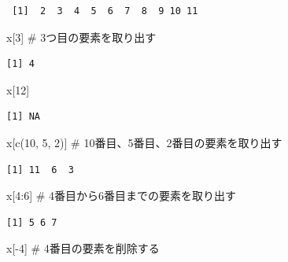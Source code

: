 \documentclass[
  letterpaper,
  DIV=11,
  numbers=noendperiod]{scrreprt}
\newenvironment{Shaded}{\begin{snugshade}}{\end{snugshade}}
\newcommand{\CommentTok}[1]{\textcolor[rgb]{0.37,0.37,0.37}{#1}}
\newcommand{\DecValTok}[1]{\textcolor[rgb]{0.68,0.00,0.00}{#1}}
\newcommand{\FunctionTok}[1]{\textcolor[rgb]{0.28,0.35,0.67}{#1}}
\newcommand{\NormalTok}[1]{\textcolor[rgb]{0.00,0.23,0.31}{#1}}
\newcommand{\SpecialCharTok}[1]{\textcolor[rgb]{0.37,0.37,0.37}{#1}}
\begin{document}
\begin{verbatim}
 [1]  2  3  4  5  6  7  8  9 10 11
\end{verbatim}

\begin{Shaded}
\begin{Highlighting}[]
\NormalTok{x[}\DecValTok{3}\NormalTok{] }\CommentTok{\# 3つ目の要素を取り出す}
\end{Highlighting}
\end{Shaded}

\begin{verbatim}
[1] 4
\end{verbatim}

\begin{Shaded}
\begin{Highlighting}[]
\NormalTok{x[}\DecValTok{12}\NormalTok{]}
\end{Highlighting}
\end{Shaded}

\begin{verbatim}
[1] NA
\end{verbatim}

\begin{Shaded}
\begin{Highlighting}[]
\NormalTok{x[}\FunctionTok{c}\NormalTok{(}\DecValTok{10}\NormalTok{, }\DecValTok{5}\NormalTok{, }\DecValTok{2}\NormalTok{)] }\CommentTok{\# 10番目、5番目、2番目の要素を取り出す}
\end{Highlighting}
\end{Shaded}

\begin{verbatim}
[1] 11  6  3
\end{verbatim}

\begin{Shaded}
\begin{Highlighting}[]
\NormalTok{x[}\DecValTok{4}\SpecialCharTok{:}\DecValTok{6}\NormalTok{] }\CommentTok{\# 4番目から6番目までの要素を取り出す}
\end{Highlighting}
\end{Shaded}

\begin{verbatim}
[1] 5 6 7
\end{verbatim}

\begin{Shaded}
\begin{Highlighting}[]
\NormalTok{x[}\SpecialCharTok{{-}}\DecValTok{4}\NormalTok{] }\CommentTok{\# 4番目の要素を削除する}
\end{Highlighting}
\end{Shaded}
\end{document}
